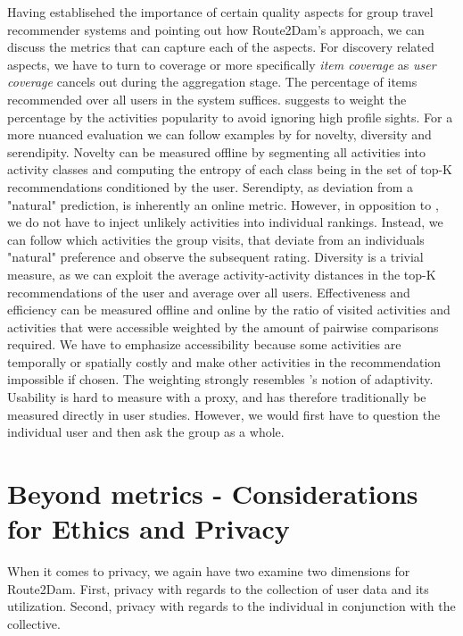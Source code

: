 \documentclass[11pt,a4paper,oneside]{article}
\begin{document}
Having establisehed the importance of certain quality aspects for group travel recommender systems and pointing out how Route2Dam's approach, we can discuss the metrics that can capture each of the aspects. 
For discovery related aspects, we have to turn to coverage or more specifically \emph{item coverage} as \emph{user coverage} cancels out during the aggregation stage. The percentage of items recommended over all users in the system suffices. \citeauthor{shani_EvaluatingRecommendationSystems_2011} suggests to weight the percentage by the activities popularity to avoid ignoring high profile sights. For a more nuanced evaluation we can follow examples by \citeauthor{shani_EvaluatingRecommendationSystems_2011} for novelty, diversity and serendipity. Novelty can be measured offline by segmenting all activities into activity classes and computing the entropy of each class being in the set of top-K recommendations conditioned by the user. Serendipty, as deviation from a "natural" prediction, is inherently an online metric. However, in opposition to \citeauthor{shani_EvaluatingRecommendationSystems_2011}, we do not have to inject unlikely activities into individual rankings. Instead, we can follow which activities the group visits, that deviate from an individuals "natural" preference and observe the subsequent rating. Diversity is a trivial measure, as we can exploit the average activity-activity distances in the top-K recommendations of the user and average over all users. Effectiveness and efficiency can be measured offline and online by the ratio of visited activities and activities that were accessible weighted by the amount of pairwise comparisons required. We have to emphasize accessibility because some activities are temporally or spatially costly and make other activities in the recommendation impossible if chosen. The weighting strongly resembles \citeauthor{shani_EvaluatingRecommendationSystems_2011}'s notion of adaptivity. Usability is hard to measure with a proxy, and has therefore traditionally be measured directly in user studies. However, we would first have to question the individual user and then ask the group as a whole.


\section{Beyond metrics - Considerations for Ethics and Privacy}
When it comes to privacy, we again have two examine two dimensions for Route2Dam. First, privacy with regards to the collection of user data and its utilization. Second, privacy with regards to the individual in conjunction with the collective. 
\end{document}
